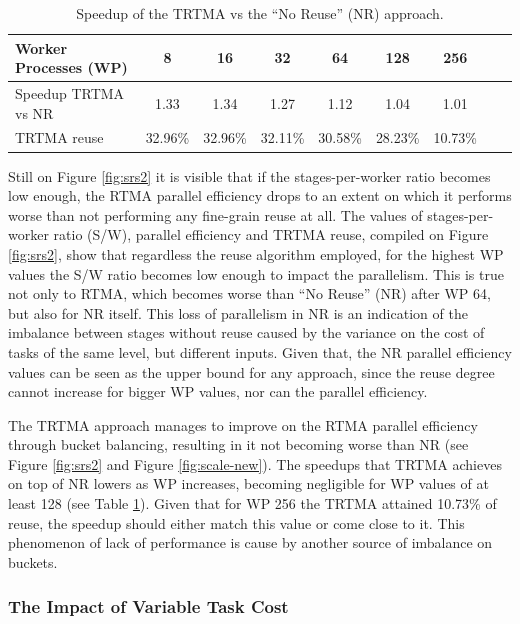 \begin{center}
\begin{table}[b]%
\centering
\begin{tabular*}{460pt}{@{\extracolsep\fill}lcccccccc@{\extracolsep\fill}}
\toprule
Worker Processes (WP)&	8		&	16		&	32		&	64		&	128		&	256	\\
\midrule
Speedup TRTMA vs NR	&	1.33	&	1.34	&	1.27	&	1.12	&	1.04	&	1.01	\\
\midrule
TRTMA reuse			&	32.96\%	&	32.96\%	&	32.11\%	&	30.58\%	&	28.23\%	&	10.73\%	\\
\bottomrule
\end{tabular*}
\caption{Speedup of the TRTMA vs the ``No Reuse'' (NR) approach. \label{tab:speedup}}
\end{table}
\vspace*{-3ex}
\end{center}

Still on Figure \ref{fig:srs2} it is visible that if the stages-per-worker ratio becomes low enough, the RTMA parallel efficiency drops to an extent on which it performs worse than not performing any fine-grain reuse at all. The values of stages-per-worker ratio (S/W), parallel efficiency and TRTMA reuse, compiled on Figure \ref{fig:srs2}, show that regardless the reuse algorithm employed, for the highest WP values the S/W ratio becomes low enough to impact the parallelism. This is true not only to RTMA, which becomes worse than ``No Reuse'' (NR) after WP 64, but also for NR itself. This loss of parallelism in NR is an indication of the imbalance between stages without reuse caused by the variance on the cost of tasks of the same level, but different inputs. Given that, the NR parallel efficiency values can be seen as the upper bound for any approach, since the reuse degree cannot increase for bigger WP values, nor can the parallel efficiency.

The TRTMA approach manages to improve on the RTMA parallel efficiency through bucket balancing, resulting in it not becoming worse than NR (see Figure \ref{fig:srs2} and Figure \ref{fig:scale-new}). The speedups that TRTMA achieves on top of NR lowers as WP increases, becoming negligible for WP values of at least 128 (see Table \ref{tab:speedup}). Given that for WP 256 the TRTMA attained 10.73\% of reuse, the speedup should either match this value or come close to it. This phenomenon of lack of performance is cause by another source of imbalance on buckets.


\subsubsection{The Impact of Variable Task Cost}
\label{sec:task-cost}

